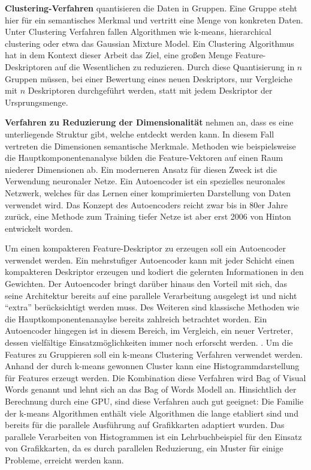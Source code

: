\textbf{Clustering-Verfahren} quantisieren die Daten in Gruppen. Eine Gruppe steht hier für ein semantisches Merkmal und vertritt eine Menge von konkreten Daten. Unter Clustering Verfahren fallen Algorithmen wie k-means, hierarchical clustering oder etwa das Gaussian Mixture Model.\newline
Ein Clustering Algorithmus hat in dem Kontext dieser Arbeit das Ziel, eine großen Menge Feature-Deskriptoren auf die Wesentlichen zu reduzieren. Durch diese Quantisierung in $n$ Gruppen müssen, bei einer Bewertung eines neuen Deskriptors, nur Vergleiche mit $n$ Deskriptoren durchgeführt werden, statt mit jedem Deskriptor der Ursprungsmenge.\newline

\textbf{Verfahren zu Reduzierung der Dimensionalität} nehmen an, dass es eine unterliegende Struktur gibt, welche entdeckt werden kann. In diesem Fall vertreten die Dimensionen semantische Merkmale. Methoden wie beispielsweise die Hauptkomponentenanalyse bilden die Feature-Vektoren auf einen Raum niederer Dimensionen ab. \newline
Ein moderneren Ansatz für diesen Zweck ist die Verwendung neuronaler Netze. Ein Autoencoder ist ein spezielles neuronales Netzwerk, welches für das Lernen einer komprimierten Darstellung von Daten verwendet wird. Das Konzept des Autoencoders reicht zwar bis in 80er Jahre zurück, eine Methode zum Training tiefer Netze ist aber erst 2006 von Hinton entwickelt worden.\newline

Um einen kompakteren Feature-Deskriptor zu erzeugen soll ein Autoencoder verwendet werden. Ein mehrstufiger Autoencoder kann mit jeder Schicht einen kompakteren Deskriptor erzeugen und kodiert die gelernten Informationen in den Gewichten. Der Autoencoder bringt darüber hinaus den Vorteil mit sich, das seine Architektur bereits auf eine parallele Verarbeitung ausgelegt ist und nicht \enquote{extra} berücksichtigt werden muss. Des Weiteren sind klassische Methoden wie die Hauptkomponentenanaylse bereits zahlreich betrachtet worden. Ein Autoencoder hingegen ist in diesem Bereich, im Vergleich, ein neuer Vertreter, dessen vielfältige Einsatzmöglichkeiten immer noch erforscht werden. . \newline  
Um die Features zu Gruppieren soll ein k-means Clustering Verfahren verwendet werden. Anhand der durch k-means gewonnen Cluster kann eine Histogrammdarstellung für Features erzeugt werden. Die Kombination diese Verfahren wird Bag of Visual Words genannt und lehnt sich an das Bag of Words Modell an. Hinsichtlich der Berechnung durch eine GPU, sind diese Verfahren auch gut geeignet: Die Familie der k-means Algorithmen enthält viele Algorithmen die lange etabliert sind und bereits für die parallele Ausführung auf Grafikkarten adaptiert wurden. Das parallele Verarbeiten von Histogrammen ist ein Lehrbuchbeispiel für den Einsatz von Grafikkarten, da es durch parallelen Reduzierung, ein Muster für einige Probleme, erreicht werden kann.


